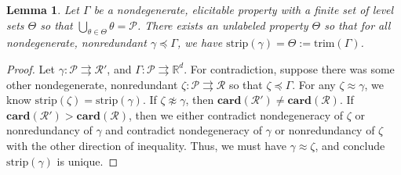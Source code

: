 \documentclass[12pt]{article}
\newcommand{\reals}{\mathbb{R}}
\renewcommand{\P}{\mathcal{P}}
\newcommand{\R}{\mathcal{R}}
\newcommand{\toto}{\rightrightarrows}
\newcommand{\strip}{\mathrm{strip}}
\newcommand{\card}{\textbf{card}}
\newtheorem{lemma}{Lemma}
\begin{document}
\begin{lemma}\label{lem:define-trim}
	Let $\Gamma$  be a nondegenerate, elicitable property with a finite set of level sets $\Theta$ so that $\bigcup_{\theta \in \Theta} \theta = \P$.
	There exists an unlabeled property $\Theta$ so that for all nondegenerate, nonredundant $\gamma \preceq \Gamma$, we have $\strip(\gamma) = \Theta := \text{trim}(\Gamma)$.
\end{lemma}

\begin{proof}
	Let $\gamma: \P \toto \R'$, and $\Gamma: \P \toto \reals^d$.
	For contradiction, suppose there was some other nondegenerate, nonredundant $\zeta: \P \toto \R$ so that $\zeta \preceq \Gamma$.
	For any $\zeta \approx \gamma$, we know $\strip(\zeta) = \strip(\gamma)$.
	If $\zeta \not \approx \gamma$, then $\card(\R') \neq \card(\R)$.
	If $\card(\R') > \card(\R)$, then we either contradict nondegeneracy of $\zeta$ or nonredundancy of $\gamma$ and contradict nondegeneracy of $\gamma$ or nonredundancy of $\zeta$ with the other direction of inequality.
	Thus, we must have $\gamma \approx \zeta$, and conclude $\strip(\gamma)$ is unique.


\end{proof}
\end{document}
